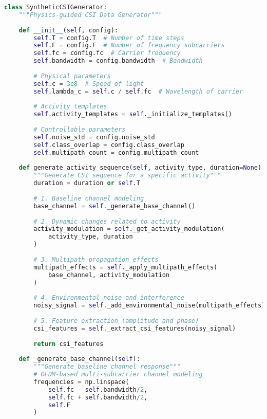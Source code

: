 \begin{lstlisting}[language=Python,caption=Core Implementation of Synthetic Data Generator]
class SyntheticCSIGenerator:
    """Physics-guided CSI Data Generator"""
    
    def __init__(self, config):
        self.T = config.T  # Number of time steps
        self.F = config.F  # Number of frequency subcarriers
        self.fc = config.fc  # Carrier frequency
        self.bandwidth = config.bandwidth  # Bandwidth
        
        # Physical parameters
        self.c = 3e8  # Speed of light
        self.lambda_c = self.c / self.fc  # Wavelength of carrier
        
        # Activity templates
        self.activity_templates = self._initialize_templates()
        
        # Controllable parameters
        self.noise_std = config.noise_std
        self.class_overlap = config.class_overlap
        self.multipath_count = config.multipath_count
    
    def generate_activity_sequence(self, activity_type, duration=None):
        """Generate CSI sequence for a specific activity"""
        duration = duration or self.T
        
        # 1. Baseline channel modeling
        base_channel = self._generate_base_channel()
        
        # 2. Dynamic changes related to activity
        activity_modulation = self._get_activity_modulation(
            activity_type, duration
        )
        
        # 3. Multipath propagation effects
        multipath_effects = self._apply_multipath_effects(
            base_channel, activity_modulation
        )
        
        # 4. Environmental noise and interference
        noisy_signal = self._add_environmental_noise(multipath_effects)
        
        # 5. Feature extraction (amplitude and phase)
        csi_features = self._extract_csi_features(noisy_signal)
        
        return csi_features
    
    def _generate_base_channel(self):
        """Generate baseline channel response"""
        # OFDM-based multi-subcarrier channel modeling
        frequencies = np.linspace(
            self.fc - self.bandwidth/2,
            self.fc + self.bandwidth/2,
            self.F
        )
        

\end{lstlisting}
